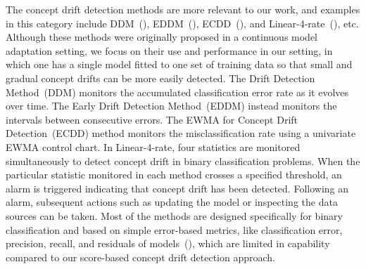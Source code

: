 \documentclass[twoside,11pt]{article}
\begin{document}
The concept drift detection methods are more relevant to our work, and examples in this category include DDM~(\cite{gama2004learning}), EDDM~(\cite{baena2006early}), ECDD~(\cite{ross2012exponentially}), and Linear-4-rate~(\cite{wang2015concept}), etc. Although these methods were originally proposed in a continuous model adaptation setting, we focus on their use and performance in our setting, in which one has a single model fitted to one set of training data so that small and gradual concept drifts can be more easily detected. The Drift Detection Method~(DDM) monitors the accumulated classification error rate as it evolves over time. The Early Drift Detection Method~(EDDM) instead monitors the intervals between consecutive errors. The EWMA for Concept Drift Detection~(ECDD) method monitors the misclassification rate using a univariate EWMA control chart. In Linear-4-rate, four statistics are monitored simultaneously to detect concept drift in binary classification problems. When the particular statistic monitored in each method crosses a specified threshold, an alarm is triggered indicating that concept drift has been detected. Following an alarm, subsequent actions such as updating the model or inspecting the data sources can be taken. Most of the methods are designed specifically for binary classification and based on simple error-based metrics, like classification error, precision, recall, and residuals of models~(\cite{wang2015concept,barros2018large}), which are limited in capability compared to our score-based concept drift detection approach.
\end{document}
